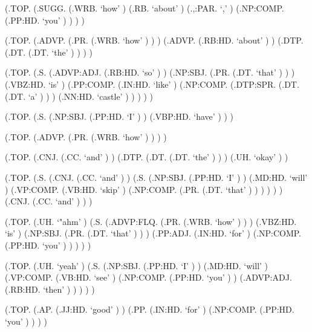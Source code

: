 \documentclass[10pt]{article}
\begin{document}
\begin{parsetree}  (.TOP. (.SUGG. (.WRB. `how' ) (.RB. `about' ) (.,:PAR. `,' ) (.NP:COMP. (.PP:HD. `you' ) ) ) ) \end{parsetree}

\begin{parsetree}  (.TOP. (.ADVP. (.PR. (.WRB. `how' ) ) ) (.ADVP. (.RB:HD. `about' ) ) (.DTP. (.DT. (.DT. `the' ) ) ) ) \end{parsetree}

\begin{parsetree}  (.TOP. (.S. (.ADVP:ADJ. (.RB:HD. `so' ) ) (.NP:SBJ. (.PR. (.DT. `that' ) ) ) (.VBZ:HD. `is' ) (.PP:COMP. (.IN:HD. `like' ) (.NP:COMP. (.DTP:SPR. (.DT. (.DT. `a' ) ) ) (.NN:HD. `castle' ) ) ) ) ) \end{parsetree}

\begin{parsetree}  (.TOP. (.S. (.NP:SBJ. (.PP:HD. `I' ) ) (.VBP:HD. `have' ) ) ) \end{parsetree}

\begin{parsetree}  (.TOP. (.ADVP. (.PR. (.WRB. `how' ) ) ) ) \end{parsetree}

\begin{parsetree}  (.TOP. (.CNJ. (.CC. `and' ) ) (.DTP. (.DT. (.DT. `the' ) ) ) (.UH. `okay' ) ) \end{parsetree}

\begin{parsetree}  (.TOP. (.S. (.CNJ. (.CC. `and' ) ) (.S. (.NP:SBJ. (.PP:HD. `I' ) ) (.MD:HD. `will' ) (.VP:COMP. (.VB:HD. `skip' ) (.NP:COMP. (.PR. (.DT. `that' ) ) ) ) ) ) (.CNJ. (.CC. `and' ) ) ) \end{parsetree}

\begin{parsetree}  (.TOP. (.UH. `"ahm' ) (.S. (.ADVP:FLQ. (.PR. (.WRB. `how' ) ) ) (.VBZ:HD. `is' ) (.NP:SBJ. (.PR. (.DT. `that' ) ) ) (.PP:ADJ. (.IN:HD. `for' ) (.NP:COMP. (.PP:HD. `you' ) ) ) ) ) \end{parsetree}

\begin{parsetree}  (.TOP. (.UH. `yeah' ) (.S. (.NP:SBJ. (.PP:HD. `I' ) ) (.MD:HD. `will' ) (.VP:COMP. (.VB:HD. `see' ) (.NP:COMP. (.PP:HD. `you' ) ) (.ADVP:ADJ. (.RB:HD. `then' ) ) ) ) ) \end{parsetree}

\begin{parsetree}  (.TOP. (.AP. (.JJ:HD. `good' ) ) (.PP. (.IN:HD. `for' ) (.NP:COMP. (.PP:HD. `you' ) ) ) ) \end{parsetree}
\end{document}
